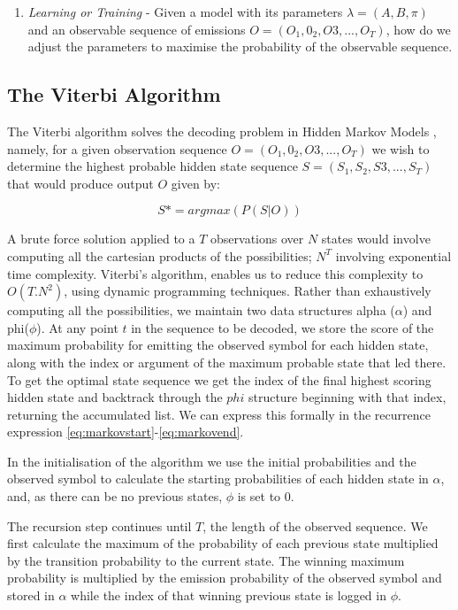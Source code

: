 {{{{{{{\begin{enumerate}
\item \textit{Learning or Training} - Given a model with its parameters $\lambda = (A, B, \pi)$ and an observable sequence of emissions $O = (O_1, 0_2, O3,..., O_T)$, how do we adjust the parameters to maximise the probability of the observable sequence.
\end{enumerate}

\subsection{The Viterbi Algorithm}

The Viterbi algorithm solves the decoding problem in Hidden Markov Models \cite{Rabiner1989}, namely, for a given observation sequence $O = (O_1, 0_2, O3,..., O_T)$  we wish to determine the highest probable hidden state sequence $S = (S_1, S_2, S3,..., S_T)$ that would produce output $O$ given by:

\begin{equation}
\label{eq:Precision}	
S*=argmax (P(S|O))
\end{equation}  

A brute force solution applied to a $T$ observations over $N$ states would involve computing all the cartesian products of the possibilities; $N^T$ involving exponential time complexity. Viterbi’s algorithm, enables us to reduce this complexity to $O(T.N^2)$, using dynamic programming techniques. Rather than exhaustively computing all the possibilities, we maintain two data structures alpha ($\alpha$) and phi($\phi$). At any point $t$ in the sequence to be decoded, we store the score of the maximum probability for emitting the observed symbol for each hidden state, along with the index or argument of the maximum probable state that led there. To get the optimal state sequence we get the index of the final highest scoring hidden state and backtrack through the $phi$ structure beginning with that index, returning the accumulated list. We can express this formally in the recurrence expression \ref{eq:markovstart}-\ref{eq:markovend}.

In the initialisation of the algorithm we use the initial probabilities and the observed symbol to calculate the starting probabilities of each hidden state in $\alpha$, and, as there can be no previous states, $\phi$ is set to 0.

The recursion step continues until $T$, the length of the observed sequence. We first calculate the maximum of the probability of each previous state multiplied by the transition probability to the current state. The winning maximum probability is multiplied by the emission probability of the observed symbol and stored in $\alpha$ while the index of that winning previous state is logged in $\phi$. 

}}}}}}}
